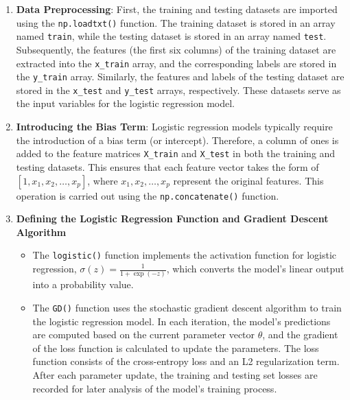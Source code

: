 \documentclass[a4paper, utf8]{ctexart}
\begin{document}
	\begin{enumerate}[itemsep=2pt, topsep=0pt, parsep=0pt]
		\item \textbf{Data Preprocessing}: First, the training and testing datasets are imported using the \verb|np.loadtxt()| function. The training dataset is stored in an array named \verb|train|, while the testing dataset is stored in an array named \verb|test|. Subsequently, the features (the first six columns) of the training dataset are extracted into the \verb|x_train| array, and the corresponding labels are stored in the \verb|y_train| array. Similarly, the features and labels of the testing dataset are stored in the \verb|x_test| and \verb|y_test| arrays, respectively. These datasets serve as the input variables for the logistic regression model.
		
		\item \textbf{Introducing the Bias Term}: Logistic regression models typically require the introduction of a bias term (or intercept). Therefore, a column of ones is added to the feature matrices \verb|X_train| and \verb|X_test| in both the training and testing datasets. This ensures that each feature vector takes the form of $[1, x_1, x_2, \dots, x_p]$, where $x_1, x_2, \dots , x_p$ represent the original features. This operation is carried out using the \verb|np.concatenate()| function.
		
		\item \textbf{Defining the Logistic Regression Function and Gradient Descent Algorithm}
		\begin{itemize}[itemsep=2pt, topsep=0pt, parsep=0pt]
		    \item The \verb|logistic()| function implements the activation function for logistic regression, $\sigma(z) = \frac{1}{1 + \exp(-z)}$, which converts the model's linear output into a probability value.
		    \item The \verb|GD()| function uses the stochastic gradient descent algorithm to train the logistic regression model. In each iteration, the model's predictions are computed based on the current parameter vector $\theta$, and the gradient of the loss function is calculated to update the parameters. The loss function consists of the cross-entropy loss and an L2 regularization term. After each parameter update, the training and testing set losses are recorded for later analysis of the model's training process.
		\end{itemize}
		

\end{enumerate}
\end{document}
